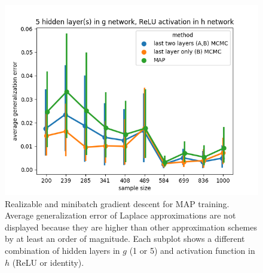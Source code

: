 \documentclass{article} %
\begin{document}
\begin{figure}[h]
\begin{center}
		\includegraphics[scale=0.4]{taskid15.png}
	\end{center}
	\caption{Realizable and minibatch gradient descent for MAP training. Average generalization error of Laplace approximations are not displayed because they are higher than other approximation schemes by at least an order of magnitude. Each subplot shows a different combination of hidden layers in $g$ (1 or 5) and activation function in $h$ (ReLU or identity). }
	\label{fig:avg_gen_err_minibatch_realizable}
\end{figure}

\begin{table}[h]%
	\centering
	\begin{tiny}
	\begin{subtable}[t]{2.5in}
		
		\caption{1 hidden layer(s) in $g$ network, identity activation in $h$ network}
	\end{subtable}
	\quad
	\begin{subtable}[t]{2.5in}
		
		\caption{5 hidden layer(s) in $g$ network, identity activation in $h$ network}
	\end{subtable}
	\quad
	\begin{subtable}[t]{2.5in}
		
		\caption{1 hidden layer(s) in $g$ network, ReLU activation in $h$ network}
	\end{subtable}
	\quad
	\begin{subtable}[t]{2.5in}
		
		\caption{5 hidden layer(s) in $g$ network, ReLU activation in $h$ network}
	\end{subtable}
	\end{tiny}
	\caption{Companion to Figure \ref{fig:avg_gen_err_minibatch_realizable}.}%
	\label{table::avg_gen_err_minibatch_realizable}%
\end{table}
\end{document}
